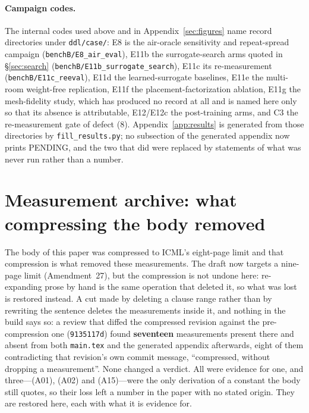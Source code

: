 \documentclass{article}
\begin{document}
\paragraph{Campaign codes.}
The internal codes used above and in Appendix~\ref{sec:figures} name record directories under
\texttt{ddl/case/}: E8 is the air-oracle sensitivity and repeat-spread campaign
(\texttt{benchB/E8\_air\_eval}), E11b the surrogate-search arms quoted in
\S\ref{sec:search} (\texttt{benchB/E11b\_surrogate\_search}), E11c its re-measurement
(\texttt{benchB/E11c\_reeval}), E11d the learned-surrogate baselines, E11e the
multi-room weight-free replication, E11f the placement-factorization ablation, E11g
the mesh-fidelity study, which has produced no record at all and is named here only so
that its absence is attributable, E12/E12c the post-training arms, and C3 the
re-measurement gate of defect (8).  Appendix~\ref{app:results} is generated from those
directories by \texttt{fill\_results.py}; no subsection of the generated appendix now
prints PENDING, and the two that did were replaced by statements of what was never run
rather than a number.


\section{Measurement archive: what compressing the body removed}
\label{app:archive}
The body of this paper was compressed to ICML's eight-page limit and that compression
is what removed these measurements.  The draft now targets a nine-page limit
(Amendment~27), but the compression is not undone here: re-expanding prose by hand is the
same operation that deleted it, so what was lost is restored instead.  A cut made by deleting a clause range rather than by rewriting the
sentence deletes the measurements inside it, and nothing in the build says so: a review
that diffed the compressed revision against the pre-compression one
(\texttt{9135117d}) found \textbf{seventeen} measurements present there and absent from both
\texttt{main.tex} and the generated appendix afterwards, eight of them contradicting that
revision's own commit message, ``compressed, without dropping a measurement''.  None
changed a verdict.  All were evidence for one, and three---(A01), (A02) and (A15)---were
the only derivation of a constant the body still quotes, so their loss left a number in
the paper with no stated origin.  They are restored here, each with what it is evidence
for.
\end{document}
